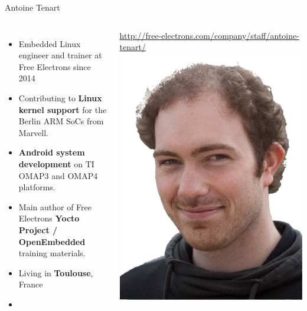 \begin{frame}{Antoine Tenart}
 \begin{columns}
    \begin{itemize}
	\item Embedded Linux engineer and trainer at Free Electrons since 2014
  	\item Contributing to {\bf Linux kernel support} for the Berlin ARM
	      SoCs from Marvell.
	\item {\bf Android system development} on TI OMAP3 and OMAP4 platforms.
	\item Main author of Free Electrons {\bf Yocto Project / OpenEmbedded}
	      training materials.
  	\item Living in {\bf Toulouse}, France
    	\item {}
    \end{itemize}
    \url{http://free-electrons.com/company/staff/antoine-tenart/}
    \includegraphics[width=\textwidth]{slides/first-slides/antoine-tenart.jpg}
 \end{columns}
\end{frame}
